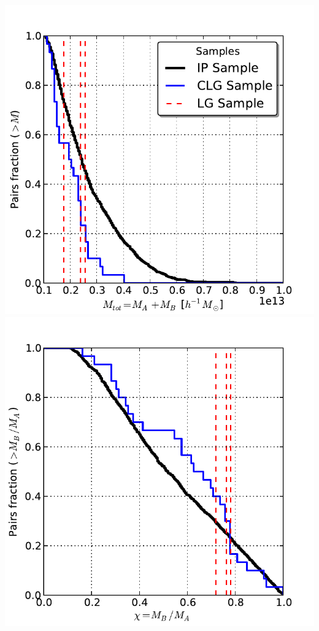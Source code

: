 \documentclass[usenatbib]{latex/mn2e}
\begin{document}
\begin{flushleft}
\begin{center}
\includegraphics[keepaspectratio=true,width=0.3\textheight]
{./figures/IP_IMF.pdf}
\includegraphics[keepaspectratio=true,width=0.3\textheight]
{./figures/IP_Mass_Ratio.pdf}


\label{fig:Index_Pairs}
\vspace{0.1 cm}
\end{center}
\end{flushleft}
\end{document}
